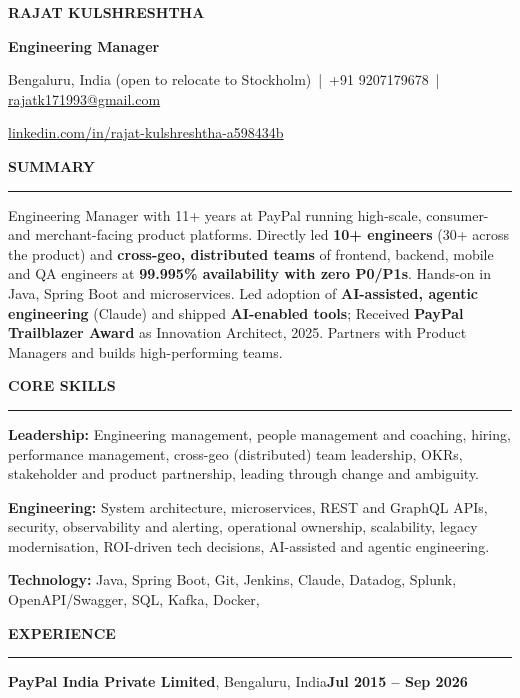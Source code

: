 \documentclass[10pt,a4paper]{article}
\renewcommand{\normalsize}{\fontsize{9.4}{10.7}\selectfont}
\newcommand{\bd}[1]{\textbf{#1}}
\newcommand{\sect}[1]{%
  \par\vspace{4pt}%
  {\bfseries\fontsize{10}{11.5}\selectfont #1}\par\nointerlineskip
  \vspace{1pt}\noindent\rule{\linewidth}{0.6pt}\par\vspace{2.5pt}}
\newcommand{\company}[3]{%
  \par\vspace{2pt}\noindent\textbf{#1}, #2\hfill\textbf{#3}\par\nopagebreak}
\begin{document}
\normalsize

\centerline{\bfseries\fontsize{15}{17}\selectfont RAJAT KULSHRESHTHA}
\vspace{1pt}
\centerline{\bfseries\fontsize{10.5}{12}\selectfont Engineering Manager}
\vspace{2pt}
\centerline{Bengaluru, India (open to relocate to Stockholm) \,|\, +91 9207179678 \,|\,
  \href{mailto:rajatk171993@gmail.com}{rajatk171993@gmail.com}}
\vspace{1pt}
\centerline{\href{https://www.linkedin.com/in/rajat-kulshreshtha-a598434b/}{linkedin.com/in/rajat-kulshreshtha-a598434b}}

\sect{SUMMARY}
Engineering Manager with 11+ years at PayPal running high-scale, consumer- and merchant-facing
product platforms. Directly led \bd{10+ engineers} (30+ across the product) and \bd{cross-geo,
distributed teams} of frontend, backend, mobile and QA engineers at \bd{99.995\% availability with
zero P0/P1s}. Hands-on in Java, Spring Boot and microservices. Led adoption of \bd{AI-assisted,
agentic engineering} (Claude) and shipped \bd{AI-enabled tools}; Received \bd{PayPal Trailblazer Award}
as Innovation Architect, 2025. Partners with Product Managers and builds high-performing teams.

\sect{CORE SKILLS}
\textbf{Leadership:} Engineering management, people management and coaching, hiring,
performance management, cross-geo (distributed) team leadership, OKRs, stakeholder
and product partnership, leading through change and ambiguity.\par
\textbf{Engineering:} System architecture, microservices, REST and GraphQL APIs, security,
observability and alerting, operational ownership, scalability, legacy
modernisation, ROI-driven tech decisions, AI-assisted and agentic engineering.\par
\textbf{Technology:} Java, Spring Boot, Git, Jenkins, Claude, Datadog,
Splunk, OpenAPI/Swagger, SQL, Kafka, Docker,

\sect{EXPERIENCE}
\company{PayPal India Private Limited}{Bengaluru, India}{Jul 2015 -- Sep 2026}
\end{document}
